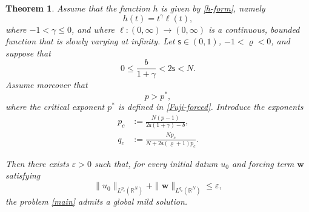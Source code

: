 \documentclass[12pt,reqno]{amsart}
\theoremstyle{plain}
\newtheorem{thm}{Theorem}[section]
\theoremstyle{definition}
\theoremstyle{remark}
\numberwithin{equation}{section}
\newcommand{\ts}{\mathsf{s}}
\begin{document}
\begin{thm}\label{Global-forced}
Assume that the function $h$ is given by \eqref{h-form}, namely
\[
h(t)=t^\gamma \ell(t),
\]
where $-1<\gamma \leq 0$, and where $\ell:(0,\infty)\to(0,\infty)$ is a continuous, bounded function that is slowly varying at infinity. 
Let $\ts \in (0,1)$, $-1<\varrho<0$, and suppose that
\[
0 \leq \frac{b}{1+\gamma} < 2\ts < N.
\]
Assume moreover that
\[
p>p^*,
\]
where the critical exponent $p^*$ is defined in \eqref{Fuji-forced}. 
Introduce the exponents
\begin{align}
p_c &:= \frac{N(p-1)}{2\ts(1+\gamma)-b}, \label{pc} \\
q_c &:= \frac{N p_c}{N + 2\ts(\varrho+1)p_c}. \label{qc}
\end{align}

Then there exists $\varepsilon>0$ such that, for every initial datum $u_0$ and forcing term $\mathbf{w}$ satisfying
\begin{equation}
\label{Small-GE}
\|u_0\|_{L^{p_c}(\mathbb{R}^N)}
+
\|\mathbf{w}\|_{L^{q_c}(\mathbb{R}^N)}
\leq \varepsilon,
\end{equation}
the problem \eqref{main} admits a global mild solution.
\end{thm}
\end{document}
